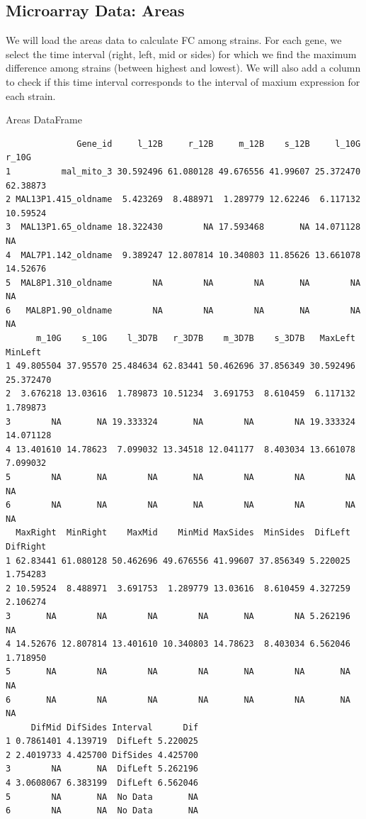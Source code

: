 \documentclass[11pt]{article}
\begin{document}
\subsection{Microarray Data: Areas}
\label{sec:orgaa34bc4}
We will load the areas data to calculate FC among strains. For each gene, we select the time interval (right, left, mid or sides) for which we find the maximum difference among strains (between highest and lowest). We will also add a column to check if this time interval corresponds to the interval of maxium expression for each strain.

Areas DataFrame
\begin{verbatim}
              Gene_id     l_12B     r_12B     m_12B    s_12B     l_10G    r_10G
1          mal_mito_3 30.592496 61.080128 49.676556 41.99607 25.372470 62.38873
2 MAL13P1.415_oldname  5.423269  8.488971  1.289779 12.62246  6.117132 10.59524
3  MAL13P1.65_oldname 18.322430        NA 17.593468       NA 14.071128       NA
4  MAL7P1.142_oldname  9.389247 12.807814 10.340803 11.85626 13.661078 14.52676
5  MAL8P1.310_oldname        NA        NA        NA       NA        NA       NA
6   MAL8P1.90_oldname        NA        NA        NA       NA        NA       NA
      m_10G    s_10G    l_3D7B   r_3D7B    m_3D7B    s_3D7B   MaxLeft   MinLeft
1 49.805504 37.95570 25.484634 62.83441 50.462696 37.856349 30.592496 25.372470
2  3.676218 13.03616  1.789873 10.51234  3.691753  8.610459  6.117132  1.789873
3        NA       NA 19.333324       NA        NA        NA 19.333324 14.071128
4 13.401610 14.78623  7.099032 13.34518 12.041177  8.403034 13.661078  7.099032
5        NA       NA        NA       NA        NA        NA        NA        NA
6        NA       NA        NA       NA        NA        NA        NA        NA
  MaxRight  MinRight    MaxMid    MinMid MaxSides  MinSides  DifLeft DifRight
1 62.83441 61.080128 50.462696 49.676556 41.99607 37.856349 5.220025 1.754283
2 10.59524  8.488971  3.691753  1.289779 13.03616  8.610459 4.327259 2.106274
3       NA        NA        NA        NA       NA        NA 5.262196       NA
4 14.52676 12.807814 13.401610 10.340803 14.78623  8.403034 6.562046 1.718950
5       NA        NA        NA        NA       NA        NA       NA       NA
6       NA        NA        NA        NA       NA        NA       NA       NA
     DifMid DifSides Interval      Dif
1 0.7861401 4.139719  DifLeft 5.220025
2 2.4019733 4.425700 DifSides 4.425700
3        NA       NA  DifLeft 5.262196
4 3.0608067 6.383199  DifLeft 6.562046
5        NA       NA  No Data       NA
6        NA       NA  No Data       NA
\end{verbatim}
\end{document}
